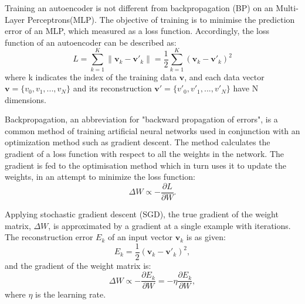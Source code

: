 \documentclass[conference]{IEEEtran}
\begin{document}
	Training an autoencoder is not different from backpropagation (BP) on an Multi-Layer Perceptrons(MLP).
	The objective of training is to minimise the prediction error of an MLP, which measured as a loss function.
	Accordingly, the loss function of an autoencoder can be described as:
	\begin{equation}
	L=\sum_{k=1}^{K}\|\mathbf{v}_{k}-\mathbf{v'}_{k}\|=\frac{1}{2}\sum_{k=1}^{K}(\mathbf{v}_{k}-\mathbf{v'}_{k})^{2}
	\end{equation}
	where k indicates the index of the training data $\mathbf{v}$, and each data vector $\mathbf{v}=\{v_0, v_1,...,v_N\}$ and its reconstruction $\mathbf{v'}=\{v'_0, v'_1,...,v'_N\}$ have N dimensions. 

	Backpropagation, an abbreviation for "backward propagation of errors", is a common method of training artificial neural networks used in conjunction with an optimization method such as gradient descent.
	The method calculates the gradient of a loss function with respect to all the weights in the network.
	The gradient is fed to the optimisation method which in turn uses it to update the weights, in an attempt to minimize the loss function:
	\begin{equation}
	\Delta W \propto -\frac{\partial L}{\partial W}.
	\end{equation}

	Applying stochastic gradient descent (SGD), the true gradient of the weight matrix, $\Delta W$, is approximated by a gradient at a single example with iterations.
	The reconstruction error $E_k$ of an input vector $\mathbf{v}_k$ is as given:
	\begin{equation}
	E_k = \frac{1}{2}(\mathbf{v}_k - \mathbf{v'}_k)^2,
	\end{equation}
	and the gradient of the weight matrix is:
	\begin{equation}
	\Delta W \propto -\frac{\partial E_k}{\partial W}=-\eta \frac{\partial E_k}{\partial W},
	\end{equation}
	where $\eta$ is the learning rate.
	
\end{document}
